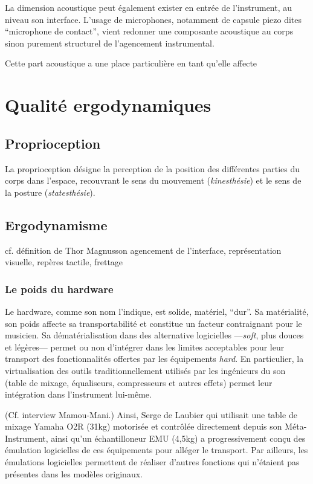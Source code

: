 La dimension acoustique peut également exister en entrée de l'instrument, au niveau son interface. L'usage de microphones, notamment de capsule piezo dites ``microphone de contact'', vient redonner une composante acoustique au corps sinon purement structurel de l'agencement instrumental.

Cette part acoustique a une place particulière en tant qu'elle affecte 



\section{Qualité ergodynamiques}


\subsection{Proprioception}
La proprioception désigne la perception de la position des différentes parties du corps dans l'espace, recouvrant le sens du mouvement (\textit{kinesthésie}) et le sens de la posture (\textit{statesthésie}).


\subsection{Ergodynamisme}
cf. définition de Thor Magnusson
agencement de l’interface, représentation visuelle, repères tactile, frettage

\subsubsection{Le poids du hardware}
Le hardware, comme son nom l'indique, est solide, matériel, ``dur''. Sa matérialité, son poids affecte sa transportabilité et constitue un facteur contraignant pour le musicien. Sa dématérialisation dans des alternative logicielles —\textit{soft}, plus douces et légères— permet ou non d'intégrer dans les limites acceptables pour leur transport des fonctionnalités offertes par les équipements \textit{hard}.
En particulier, la virtualisation des outils traditionnellement utilisés par les ingénieurs du son (table de mixage, équaliseurs, compresseurs et autres effets) permet leur intégration dans l'instrument lui-même.

(Cf. interview Mamou-Mani.)
Ainsi, Serge de Laubier qui utilisait une table de mixage Yamaha O2R (31kg) motorisée et contrôlée directement depuis son Méta-Instrument, ainsi qu'un échantilloneur EMU (4,5kg) a progressivement conçu des émulation logicielles de ces équipements pour alléger le transport. Par ailleurs, les émulations logicielles permettent de réaliser d'autres fonctions qui n'étaient pas présentes dans les modèles originaux.


